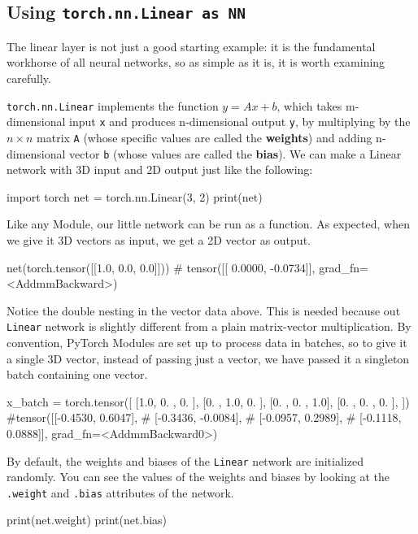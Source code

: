 \subsection*{Using \texttt{torch.nn.Linear as NN}}

The linear layer is not just a good starting example: it is the fundamental workhorse of all neural networks, so as simple as it is, it is worth examining carefully. 

\texttt{torch.nn.Linear} implements the function \textbf{$y = Ax + b$}, which takes m-dimensional input \texttt{x} and produces n-dimensional output \texttt{y}, by multiplying by the $n\times n$ matrix \texttt{A} (whose specific values are called the \textbf{weights}) and adding n-dimensional vector \texttt{b} (whose values are called the \textbf{bias}). We can make a Linear network with 3D input and 2D output just like the following:


\begin{codeblock}[language=python]
import torch
net = torch.nn.Linear(3, 2)
print(net)
\end{codeblock}

Like any Module, our little network can be run as a function. As expected, when we give it 3D vectors as input, we get a 2D vector as output. 

\begin{codeblock}[language=python]
    net(torch.tensor([[1.0, 0.0, 0.0]]))
    # tensor([[ 0.0000, -0.0734]], grad_fn=<AddmmBackward>)
\end{codeblock}

\begin{observationblock}
    Notice the double nesting in the vector data above. This is needed because out \texttt{Linear} network is slightly different from a plain matrix-vector multiplication. By convention, PyTorch Modules are set up to process data in batches, so to give it a single 3D vector, instead of passing just a vector, we have passed it a singleton batch containing one vector. 
    \begin{codeblock}[language=python]
x_batch = torch.tensor([
    [1.0, 0. , 0. ],
    [0. , 1.0, 0. ],
    [0. , 0. , 1.0],
    [0. , 0. , 0. ],
])
#tensor([[-0.4530,  0.6047],
#       [-0.3436, -0.0084],
#       [-0.0957,  0.2989],
#       [-0.1118,  0.0888]], grad_fn=<AddmmBackward0>)
    \end{codeblock}
\end{observationblock}

By default, the weights and biases of the \texttt{Linear} network are initialized randomly.  You can see the values of the weights and biases by looking at the \texttt{.weight} and \texttt{.bias} attributes of the network.
\begin{codeblock}[language=python]
print(net.weight)
print(net.bias)
\end{codeblock}

